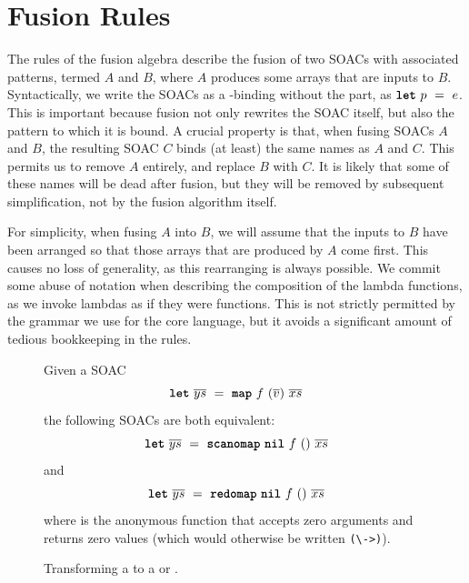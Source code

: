 \section{Fusion Rules}
\label{sec:fusionalgebra}

The rules of the fusion algebra describe the fusion of two SOACs with
associated patterns, termed $A$ and $B$, where $A$ produces some
arrays that are inputs to $B$.  Syntactically, we write the SOACs as a
-binding without the  part, as $\mbox{\texttt{\bfseries{let}}}~p~=~e$.  This
is important because fusion not only rewrites the SOAC itself, but
also the pattern to which it is bound.  A crucial property is that,
when fusing SOACs $A$ and $B$, the resulting SOAC $C$ binds (at least)
the same names as $A$ and $C$.  This permits us to remove $A$
entirely, and replace $B$ with $C$.  It is likely that some of these
names will be dead after fusion, but they will be removed by
subsequent simplification, not by the fusion algorithm itself.

For simplicity, when fusing $A$ into $B$, we will assume that the
inputs to $B$ have been arranged so that those arrays that are
produced by $A$ come first.  This causes no loss of generality, as
this rearranging is always possible.  We commit some abuse of notation
when describing the composition of the lambda functions, as we invoke
lambdas as if they were functions.  This is not strictly permitted by
the grammar we use for the core language, but it avoids a significant
amount of tedious bookkeeping in the rules.

\begin{figure}[bt]
  Given a SOAC
\[
  \mbox{\texttt{\bfseries{let}}}~\overline{ys}~=~\mbox{\texttt{\bfseries{map}}}~f~(\overline{v})~\overline{xs}
\]
the following SOACs are both equivalent:
\[
  \mbox{\texttt{\bfseries{let}}}~\overline{ys}~=~\mbox{\texttt{\bfseries{scanomap}}}~\mbox{\texttt{\bfseries{nil}}}~f~()~\overline{xs}
\]
and
\[
  \mbox{\texttt{\bfseries{let}}}~\overline{ys}~=~\mbox{\texttt{\bfseries{redomap}}}~\mbox{\texttt{\bfseries{nil}}}~f~()~\overline{xs}
\]
where  is the anonymous function that accepts zero arguments
and returns zero values (which would otherwise be written
\lstinline{(\->)}).
  \caption{Transforming a  to a  or .}
  \label{fig:map-to-scanomap-or-redomap}
\end{figure}

